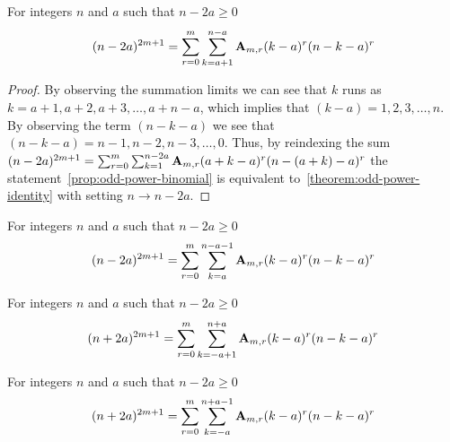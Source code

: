 ﻿\begin{proposition}
    \label{prop:odd-power-binomial}
    For integers $n$ and $a$ such that $n-2a \geq 0$
    \begin{align*}
    (n-2a)
        ^{2m+1} = \sum_{r=0}^{m} \sum_{k=a+1}^{n-a} {\mathbf{A}} \sb{m,r} (k-a)^r (n-k-a)^r
    \end{align*}
    \begin{proof}
        By observing the summation limits we can see that $k$ runs as $k=a+1,a+2,a+3,\ldots,a+n-a$, which
        implies that $(k-a)=1,2,3,\ldots, n$.
        By observing the term $(n-k-a)$ we see that $(n-k-a)=n-1,n-2,n-3,\ldots,0$.
        Thus, by reindexing the sum
        $(n-2a)^{2m+1} = \sum_{r=0}^{m} \sum_{k=1}^{n-2a} {\mathbf{A}} \sb{m,r} (a+k-a)^r (n-(a+k)-a)^r$
        the statement~\eqref{prop:odd-power-binomial} is equivalent to~\eqref{theorem:odd-power-identity}
        with setting $n \rightarrow n-2a$.
    \end{proof}
\end{proposition}

\begin{corollary}
    \label{prop:odd-power-binomial-shifted}
    For integers $n$ and $a$ such that $n-2a \geq 0$
    \begin{align*}
    (n-2a)
        ^{2m+1} = \sum_{r=0}^{m} \sum_{k=a}^{n-a-1} {\mathbf{A}} \sb{m,r} (k-a)^r (n-k-a)^r
    \end{align*}
\end{corollary}

\begin{corollary}
    \label{prop:odd-power-binomial-plus}
    For integers $n$ and $a$ such that $n-2a \geq 0$
    \begin{align*}
    (n+2a)^{2m+1} = \sum_{r=0}^{m} \sum_{k=-a+1}^{n+a} {\mathbf{A}} \sb{m,r} (k-a)^r (n-k-a)^r
    \end{align*}
\end{corollary}

\begin{corollary}
    \label{prop:odd-power-binomial-plus-shifted}
    For integers $n$ and $a$ such that $n-2a \geq 0$
    \begin{align*}
    (n+2a)^{2m+1} = \sum_{r=0}^{m} \sum_{k=-a}^{n+a-1} {\mathbf{A}} \sb{m,r} (k-a)^r (n-k-a)^r
    \end{align*}
\end{corollary}
